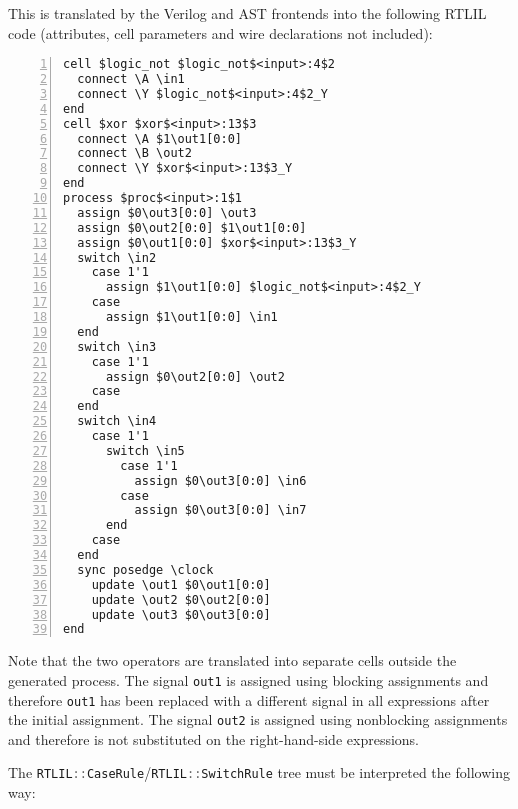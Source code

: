 This is translated by the Verilog and AST frontends into the following RTLIL code (attributes, cell parameters
and wire declarations not included):

\begin{lstlisting}[numbers=left,frame=single,language=rtlil]
cell $logic_not $logic_not$<input>:4$2
  connect \A \in1
  connect \Y $logic_not$<input>:4$2_Y
end
cell $xor $xor$<input>:13$3
  connect \A $1\out1[0:0]
  connect \B \out2
  connect \Y $xor$<input>:13$3_Y
end
process $proc$<input>:1$1
  assign $0\out3[0:0] \out3
  assign $0\out2[0:0] $1\out1[0:0]
  assign $0\out1[0:0] $xor$<input>:13$3_Y
  switch \in2
    case 1'1
      assign $1\out1[0:0] $logic_not$<input>:4$2_Y
    case
      assign $1\out1[0:0] \in1
  end
  switch \in3
    case 1'1
      assign $0\out2[0:0] \out2
    case
  end
  switch \in4
    case 1'1
      switch \in5
        case 1'1
          assign $0\out3[0:0] \in6
        case
          assign $0\out3[0:0] \in7
      end
    case
  end
  sync posedge \clock
    update \out1 $0\out1[0:0]
    update \out2 $0\out2[0:0]
    update \out3 $0\out3[0:0]
end
\end{lstlisting}

Note that the two operators are translated into separate cells outside the generated process. The signal
\lstinline[language=Verilog]{out1} is assigned using blocking assignments and therefore \lstinline[language=Verilog]{out1}
has been replaced with a different signal in all expressions after the initial assignment. The signal
\lstinline[language=Verilog]{out2} is assigned using nonblocking assignments and therefore is not substituted
on the right-hand-side expressions.

The \lstinline[language=C++]{RTLIL::CaseRule}/\lstinline[language=C++]{RTLIL::SwitchRule}
tree must be interpreted the following way:

